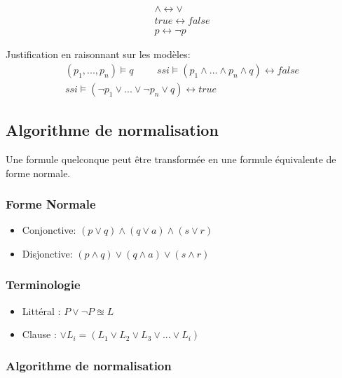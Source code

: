 \begin{align*}
\land \leftrightarrow \lor \\ 
true \leftrightarrow false \\ 
p \leftrightarrow \lnot p 
\end{align*}

 Justification en raisonnant sur les modèles:
 \begin{align*}
	 (p_1,...,p_n) \models q \hspace{1cm} ssi \models (p_1 \land ... \land p_n \land q) \leftrightarrow false \\
	 ssi \models ( \lnot p_1 \lor ... \lor \lnot p_n \lor q) \leftrightarrow true
 \end{align*}



\subsection{Algorithme de normalisation}

Une formule quelconque peut être transformée en une formule équivalente de forme normale.

\subsubsection{Forme Normale}

\begin{itemize}
  \item Conjonctive: $( p \lor q ) \land ( q \lor a ) \land ( s \lor r )$  
  \item Disjonctive: $( p \land q ) \lor ( q \land a ) \lor ( s \land r )$  
\end{itemize}

\subsubsection{Terminologie}

\begin{itemize}
	\item Littéral : $P \lor \lnot P \approxeq L$
	\item Clause : $\lor L_i = ( L_1 \lor L_2 \lor L_3 \lor ... \lor L_i )$
\end{itemize}

\subsubsection{Algorithme de normalisation}

